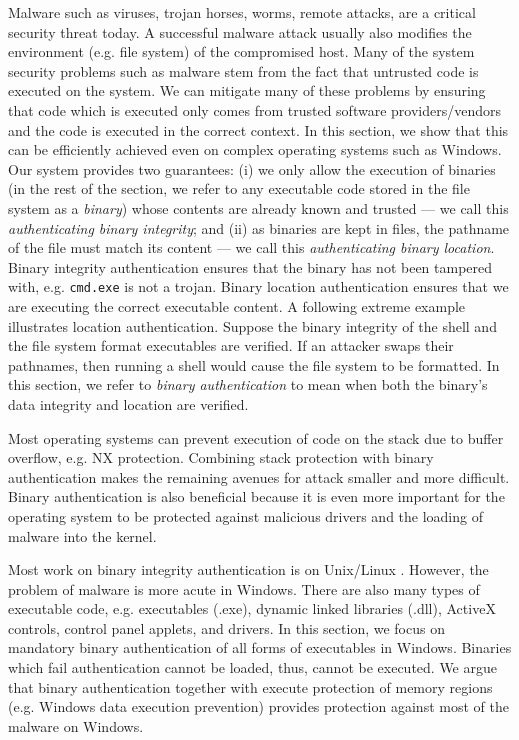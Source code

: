
Malware such as viruses, trojan horses, worms, remote attacks, 
are a critical security threat today.
A successful malware attack usually also modifies
the environment (e.g. file system) of the compromised host.
Many of the system security problems such as malware stem from the fact that untrusted code is executed
on the system.
We can mitigate many of these problems by ensuring that code which is executed only comes
from trusted software providers/vendors and the code is executed in the correct context.
In this section, we show that this can be efficiently achieved even on complex
operating systems such
as Windows. Our system provides two guarantees:
(i) we only allow the execution of binaries (in the rest of the section, we refer
to any executable code stored in the file system as a {\em binary})
whose contents are already known and trusted --- we call this {\em authenticating binary integrity};
and (ii) as binaries are kept in files, the pathname of the file must 
match its content --- we call this {\em authenticating binary location}. 
Binary integrity authentication ensures that the binary has not been
tampered with, e.g. {\tt cmd.exe} is not a trojan.
Binary location authentication ensures that we are executing
the correct executable content. 
A following extreme example illustrates location authentication. 
Suppose the binary integrity of the shell and the file system format executables 
are verified. If an attacker swaps their pathnames,
then running a shell would cause the file system to be formatted.
In this section, we refer to {\em binary authentication} to mean when 
both the binary's data integrity and location are verified.

Most operating systems can prevent execution of code
on the stack due to buffer overflow, e.g. NX protection.
Combining stack protection with binary authentication
makes the remaining avenues for attack 
smaller and more difficult.
Binary authentication is also beneficial because it is even more important
for the operating system to be protected against malicious drivers
and the loading of malware into the kernel.

Most work on binary integrity authentication is on Unix/Linux
\cite{apvrille2004digsig,williams2002anti,doorn01signedexecutables}.
However, the problem of malware is more acute in Windows.
There are also many types of executable code,
e.g. executables (.exe), dynamic linked libraries (.dll), 
ActiveX controls, control panel applets, and drivers. 
In this section, we focus on mandatory binary authentication of all forms
of executables in Windows. 
Binaries which fail authentication cannot be loaded, thus,
cannot be executed. We argue that binary authentication together with 
execute protection of memory regions (e.g. Windows data execution prevention) 
provides protection against most of the malware on Windows.

